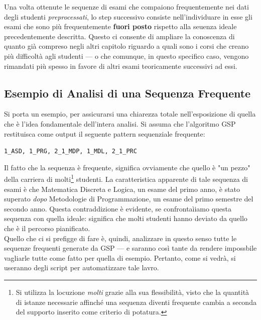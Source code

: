     Una volta ottenute le sequenze di esami che compaiono frequentemente nei dati degli studenti \textit{preprocessati}, lo step successivo consiste nell'individuare in esse gli esami che sono più frequentemente \textbf{fuori posto} rispetto alla seuenza ideale precedentemente descritta. Questo ci consente di ampliare la conoscenza di quanto già compreso negli altri capitolo riguardo a quali sono i corsi che creano più difficoltà agli studenti --- o che comunque, in questo specifico caso, vengono rimandati più spesso in favore di altri esami teoricamente successivi ad essi. \\

    \subsection{Esempio di Analisi di una Sequenza Frequente}

    Si porta un esempio, per assicurarsi una chiarezza totale nell'esposizione di quella che è l'idea fondamentale dell'intera analisi. Si assuma che l'algoritmo GSP restituisca come output il seguente pattern sequenziale frequente: \\

    \begin{centering}
        \texttt{1\_ASD, 1\_PRG, 2\_1\_MDP, 1\_MDL, 2\_1\_PRC}
    \end{centering}

    \vspace{0.35cm}

    Il fatto che la sequenza è frequente, significa ovviamente che quello è "un pezzo" della carriera di molti\footnote{Si utilizza la locuzione \textit{molti} grazie alla sua flessibilità, visto che la quantità di istanze necessarie affinché una sequenza diventi frequente cambia a seconda del supporto inserito come criterio di potatura.} studenti. La caratteristica apparente di tale sequenza di esami è che Matematica Discreta e Logica, un esame del primo anno, è stato superato \textit{dopo} Metodologie di Programmazione, un esame del primo semestre del secondo anno. Questa contraddizione è evidente, se confrontaìiamo questa sequenza con quella ideale: significa che molti studenti hanno deviato da quello che è il percorso pianificato.\\

    Quello che ci si prefigge di fare è, quindi, analizzare in questo senso tutte le sequenze frequenti generate da GSP --- e saranno così tante da rendere impossbile vagliarle tutte come fatto per quella di esempio. Pertanto, come si vedrà, si useranno degli script per automatizzare tale lavro.

